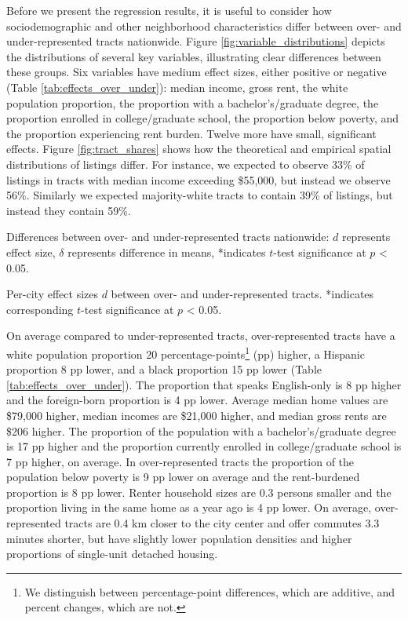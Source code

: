 \documentclass[11pt,onecolumn]{article} %
\begin{document}
Before we present the regression results, it is useful to consider how sociodemographic and other neighborhood characteristics differ between over- and under-represented tracts nationwide. Figure \ref{fig:variable_distributions} depicts the distributions of several key variables, illustrating clear differences between these groups. Six variables have medium effect sizes, either positive or negative (Table \ref{tab:effects_over_under}): median income, gross rent, the white population proportion, the proportion with a bachelor's/graduate degree, the proportion enrolled in college/graduate school, the proportion below poverty, and the proportion experiencing rent burden. Twelve more have small, significant effects. Figure \ref{fig:tract_shares} shows how the theoretical and empirical spatial distributions of listings differ. For instance, we expected to observe 33\% of listings in tracts with median income exceeding \$55,000, but instead we observe 56\%. Similarly we expected majority-white tracts to contain 39\% of listings, but instead they contain 59\%.

\begin{table}[tbp]
	\centering
	\small
	\caption{Differences between over- and under-represented tracts nationwide: $d$ represents effect size, $\delta$ represents difference in means, *indicates $t$-test significance at $p$ < 0.05.}
	\label{tab:effects_over_under}
	
\end{table}

\begin{table}[tbp]
	\scriptsize
	\centering
	\caption{Per-city effect sizes $d$ between over- and under-represented tracts. *indicates corresponding $t$-test significance at $p$ < 0.05.}
	\label{tab:effects_cities}
	
\end{table}

On average compared to under-represented tracts, over-represented tracts have a white population proportion 20 percentage-points\footnote{We distinguish between percentage-point differences, which are additive, and percent changes, which are not.} (pp) higher, a Hispanic proportion 8 pp lower, and a black proportion 15 pp lower (Table \ref{tab:effects_over_under}). The proportion that speaks English-only is 8 pp higher and the foreign-born proportion is 4 pp lower. Average median home values are \$79,000 higher, median incomes are \$21,000 higher, and median gross rents are \$206 higher. The proportion of the population with a bachelor's/graduate degree is 17 pp higher and the proportion currently enrolled in college/graduate school is 7 pp higher, on average. In over-represented tracts the proportion of the population below poverty is 9 pp lower on average and the rent-burdened proportion is 8 pp lower. Renter household sizes are 0.3 persons smaller and the proportion living in the same home as a year ago is 4 pp lower. On average, over-represented tracts are 0.4 km closer to the city center and offer commutes 3.3 minutes shorter, but have slightly lower population densities and higher proportions of single-unit detached housing.
\end{document}

